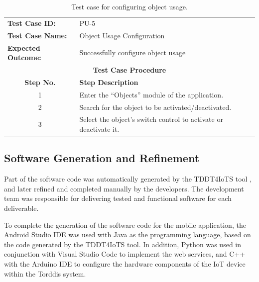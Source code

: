                 \begin{table}[!htbp]
                    \centering
                    \caption{Test case for configuring object usage.}
                    \label{tab:configure-object-usage-test-case}
                    \begin{tabularx}{\textwidth}{l X}
                        \toprule
                        \textbf{Test Case ID:} & PU-5 \\
                        \textbf{Test Case Name:} & Object Usage Configuration \\
                        \textbf{Expected Outcome:} & Successfully configure object usage \\
                        \midrule
                        \multicolumn{2}{c}{\textbf{Test Case Procedure}} \\
                        \midrule
                        \multicolumn{1}{c}{\textbf{Step No.}} & \textbf{Step Description} \\
                        \midrule
                        \multicolumn{1}{c}{1} & Enter the ``Objects'' module of the application. \\
                        \multicolumn{1}{c}{2} & Search for the object to be activated/deactivated. \\
                        \multicolumn{1}{c}{3} & Select the object’s switch control to activate or deactivate it. \\
                        \bottomrule
                    \end{tabularx}
                \end{table}
                
                \subsection{Software Generation and Refinement}
                Part of the software code was automatically generated by the TDDT4IoTS tool \citep{Guerrero2024Test}, and later refined and completed manually by the developers. The development team was responsible for delivering tested and functional software for each deliverable.
                
                To complete the generation of the software code for the mobile application, the Android Studio IDE \cite{Android2024Android} was used with Java as the programming language, based on the code generated by the TDDT4IoTS tool. In addition, Python was used in conjunction with Visual Studio Code \citep{Microsoft2024Visual} to implement the web services, and C++ with the Arduino IDE \citep{Arduino2024Software} to configure the hardware components of the IoT device within the Torddis system.
                
